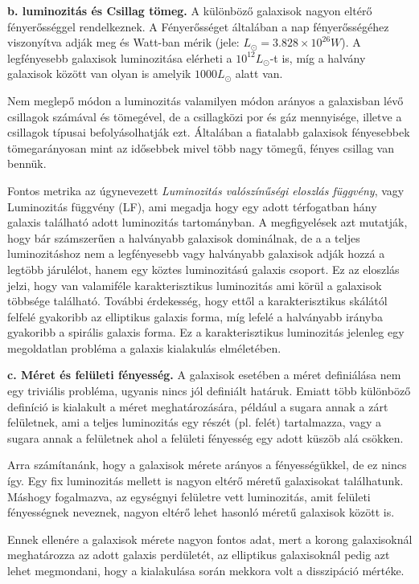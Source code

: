 \documentclass[../main.tex]{subfiles}
\begin{document}
\textbf{b. luminozitás és Csillag tömeg.} A különböző galaxisok nagyon eltérő fényerősséggel rendelkeznek. A Fényerősséget általában a nap fényerősségéhez viszonyítva adják meg és Watt-ban mérik (jele: $L_\odot = 3.828 \times 10^{26} W$).
A legfényesebb galaxisok luminozitása elérheti a $10^{12} L_\odot$-t is, míg a halvány galaxisok között van olyan is amelyik $1000L_\odot$ alatt van. 

Nem meglepő módon a luminozitás valamilyen módon arányos a galaxisban lévő csillagok számával és tömegével, de a csillagközi por és gáz mennyisége, illetve a csillagok típusai befolyásolhatják ezt.
Általában a fiatalabb galaxisok fényesebbek tömegarányosan mint az idősebbek mivel több nagy tömegű, fényes csillag van bennük.

Fontos metrika az úgynevezett \textit{Luminozitás valószínűségi eloszlás függvény}, vagy Luminozitás függvény (LF), ami megadja hogy egy adott térfogatban hány galaxis található adott luminozitás tartományban.
A megfigyelések azt mutatják, hogy bár számszerűen a halványabb galaxisok dominálnak, de a a teljes luminozitáshoz nem a legfényesebb vagy halványabb galaxisok adják hozzá a legtöbb járulélot, hanem egy köztes luminozitású galaxis csoport.
Ez az eloszlás jelzi, hogy van valamiféle karakterisztikus luminozitás ami körül a galaxisok többsége található. További érdekesség, hogy ettől a karakterisztikus skálától felfelé gyakoribb az elliptikus galaxis forma, míg lefelé a halványabb irányba
gyakoribb a spirális galaxis forma. Ez a karakterisztikus luminozitás jelenleg egy megoldatlan probléma a galaxis kialakulás elméletében.

\textbf{c. Méret és felületi fényesség.} A galaxisok esetében a méret definiálása nem egy triviális probléma, ugyanis nincs jól definiált határuk. Emiatt több különböző definíció is kialakult a méret meghatározására,
például a sugara annak a zárt felületnek, ami a teljes luminozitás egy részét (pl. felét) tartalmazza, vagy a sugara annak a felületnek ahol a felületi fényesség egy adott küszöb alá csökken. 

Arra számítanánk, hogy a galaxisok mérete arányos a fényességükkel, de ez nincs így. Egy fix luminozitás mellett is nagyon eltérő méretű galaxisokat találhatunk. Máshogy fogalmazva, az egységnyi felületre vett
luminozitás, amit felületi fényességnek neveznek, nagyon eltérő lehet hasonló méretű galaxisok között is.

Ennek ellenére a galaxisok mérete nagyon fontos adat, mert a korong galaxisoknál meghatározza az adott galaxis perdületét, az elliptikus galaxisoknál pedig azt lehet megmondani, hogy 
a kialakulása során mekkora volt a disszipáció mértéke.
\end{document}
